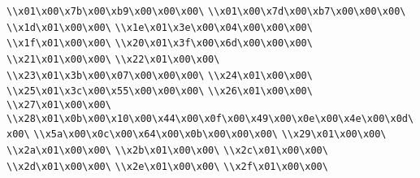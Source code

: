 \verb|\\x01\x00\x7b\x00\xb9\x00\x00\x00\|\newline
\verb|\\x01\x00\x7d\x00\xb7\x00\x00\x00\|\newline
\verb|\\x1d\x01\x00\x00\|\newline
\verb|\\x1e\x01\x3e\x00\x04\x00\x00\x00\|\newline
\verb|\\x1f\x01\x00\x00\|\newline
\verb|\\x20\x01\x3f\x00\x6d\x00\x00\x00\|\newline
\verb|\\x21\x01\x00\x00\|\newline
\verb|\\x22\x01\x00\x00\|\newline
\verb|\\x23\x01\x3b\x00\x07\x00\x00\x00\|\newline
\verb|\\x24\x01\x00\x00\|\newline
\verb|\\x25\x01\x3c\x00\x55\x00\x00\x00\|\newline
\verb|\\x26\x01\x00\x00\|\newline
\verb|\\x27\x01\x00\x00\|\newline
\verb|\\x28\x01\x0b\x00\x10\x00\x44\x00\x0f\x00\x49\x00\x0e\x00\x4e\x00\x0d\x00\|\newline
\verb|\\x5a\x00\x0c\x00\x64\x00\x0b\x00\x00\x00\|\newline
\verb|\\x29\x01\x00\x00\|\newline
\verb|\\x2a\x01\x00\x00\|\newline
\verb|\\x2b\x01\x00\x00\|\newline
\verb|\\x2c\x01\x00\x00\|\newline
\verb|\\x2d\x01\x00\x00\|\newline
\verb|\\x2e\x01\x00\x00\|\newline
\verb|\\x2f\x01\x00\x00\|\newline
